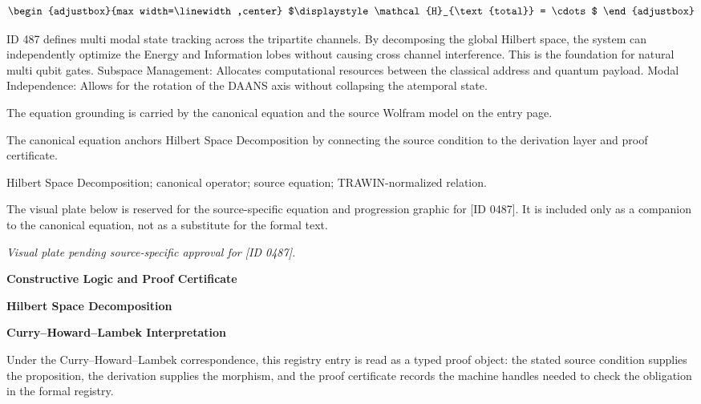 \[
\begin{adjustbox}{max width=\linewidth,center}
$\displaystyle
\mathcal{H}_{\text{total}} = \cdots
$
\end{adjustbox}
\]

ID 487 defines multi modal state tracking across the tripartite channels. By decomposing the global Hilbert space, the system can independently optimize the Energy and Information lobes without causing cross channel interference. This is the foundation for natural multi qubit gates. Subspace Management: Allocates computational resources between the classical address and quantum payload. Modal Independence: Allows for the rotation of the DAANS axis without collapsing the atemporal state.

The equation grounding is carried by the canonical equation and the source Wolfram model on the entry page.

The canonical equation anchors Hilbert Space Decomposition by connecting the source condition to the derivation layer and proof certificate.

Hilbert Space Decomposition; canonical operator; source equation; TRAWIN-normalized relation.
\endgroup

\begingroup\footnotesize\sloppy
The visual plate below is reserved for the source-specific equation and progression graphic for [ID 0487]. It is included only as a companion to the canonical equation, not as a substitute for the formal text.
\par\endgroup
\begingroup\footnotesize\itshape
Visual plate pending source-specific approval for [ID 0487].
\par\endgroup

\clearpage
\begingroup\tzpsupportsetup
\noindent\textbf{\fontsize{10.8pt}{12.8pt}\selectfont [ID 0487] Constructive Logic and Proof Certificate}\par
\noindent\textbf{\fontsize{10pt}{12pt}\selectfont Hilbert Space Decomposition}\par
\vspace{0.45em}
\begingroup
\footnotesize
\setlength{\parskip}{0.22em}
\setlength{\parindent}{0pt}
\noindent\textbf{Curry--Howard--Lambek Interpretation}\par
Under the Curry--Howard--Lambek correspondence, this registry entry is read as a typed proof
object: the stated source condition supplies the proposition, the derivation supplies the
morphism, and the proof certificate records the machine handles needed to check the obligation
in the formal registry.

